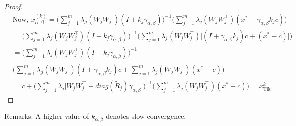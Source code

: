 \documentclass[smallextended,referee,envcountsect]{svjour3}
\begin{document}
\begin{proof}
\begin{align*}
&\text{Now},~x_{\alpha,\beta}^{(k)} = \Big( \sum_{j=1}^{m} \lambda_j (W_j W_j^\top)(I + k_j \gamma_{\alpha,\beta}) \Big)^{-1} \Big( \sum_{j=1}^{m} \lambda_j (W_j W_j^\top)(x^* + \gamma_{\alpha,\beta} k_j c) \Big)\\
&= \Big( \sum_{j=1}^{m} \lambda_j (W_j W_j^\top)(I + k_j \gamma_{\alpha,\beta}) \Big)^{-1} \Big( \sum_{j=1}^{m} \lambda_j (W_j W_j^\top)\Big[(I + \gamma_{\alpha,\beta} k_j) c +(x^* - c)\Big] \Big)\\
&= \Big( \sum_{j=1}^{m} \lambda_j (W_j W_j^\top)(I + k_j \gamma_{\alpha,\beta}) \Big)^{-1}\\
&
\Big( \sum_{j=1}^{m} \lambda_j (W_j W_j^\top)(I + \gamma_{\alpha,\beta} k_j) c + \sum_{j=1}^{m} \lambda_j (W_j W_j^\top)(x^* - c) \Big)\\
&= c + \Big( \sum_{j=1}^{m} \lambda_j \Big[W_j W_j^\top +  diag(\tilde{R}_j) \gamma_{\alpha,\beta}\Big] \Big)^{-1} \Big(\sum_{j=1}^{m} \lambda_j (W_j W_j^\top)(x^* - c)\Big)
= x^{k}_{\text{Tik}}.
\end{align*} 
\end{proof}
Remarks: A higher value of ${k_{\alpha,\beta}}$ denotes slow convergence. 
\end{document}
